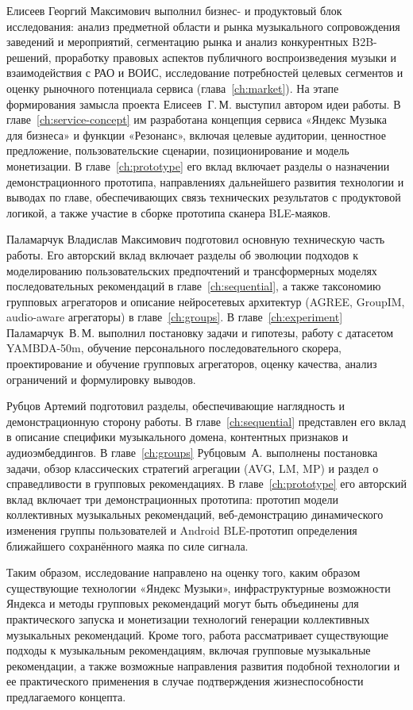 Елисеев Георгий Максимович выполнил бизнес- и продуктовый блок исследования: анализ предметной области и рынка музыкального сопровождения заведений и мероприятий, сегментацию рынка и анализ конкурентных B2B-решений, проработку правовых аспектов публичного воспроизведения музыки и взаимодействия с РАО и ВОИС, исследование потребностей целевых сегментов и оценку рыночного потенциала сервиса (глава~\ref{ch:market}). На этапе формирования замысла проекта Елисеев~Г.\,М. выступил автором идеи работы. В главе~\ref{ch:service-concept} им разработана концепция сервиса «Яндекс Музыка для бизнеса» и функции «Резонанс», включая целевые аудитории, ценностное предложение, пользовательские сценарии, позиционирование и модель монетизации. В главе~\ref{ch:prototype} его вклад включает разделы о назначении демонстрационного прототипа, направлениях дальнейшего развития технологии и выводах по главе, обеспечивающих связь технических результатов с продуктовой логикой, а также участие в сборке прототипа сканера BLE-маяков.

Паламарчук Владислав Максимович подготовил основную техническую часть работы. Его авторский вклад включает разделы об эволюции подходов к моделированию пользовательских предпочтений и трансформерных моделях последовательных рекомендаций в главе~\ref{ch:sequential}, а также таксономию групповых агрегаторов и описание нейросетевых архитектур (AGREE, GroupIM, audio-aware агрегаторы) в главе~\ref{ch:groups}. В главе~\ref{ch:experiment} Паламарчук~В.\,М. выполнил постановку задачи и гипотезы, работу с датасетом YAMBDA-50m, обучение персонального последовательного скорера, проектирование и обучение групповых агрегаторов, оценку качества, анализ ограничений и формулировку выводов.

Рубцов Артемий подготовил разделы, обеспечивающие наглядность и демонстрационную сторону работы. В главе~\ref{ch:sequential} представлен его вклад в описание специфики музыкального домена, контентных признаков и аудиоэмбеддингов. В главе~\ref{ch:groups} Рубцовым~А. выполнены постановка задачи, обзор классических стратегий агрегации (AVG, LM, MP) и раздел о справедливости в групповых рекомендациях. В главе~\ref{ch:prototype} его авторский вклад включает три демонстрационных прототипа: прототип модели коллективных музыкальных рекомендаций, веб-демонстрацию динамического изменения группы пользователей и Android BLE-прототип определения ближайшего сохранённого маяка по силе сигнала.

Таким образом, исследование направлено на оценку того, каким образом существующие технологии «Яндекс Музыки», инфраструктурные возможности Яндекса и методы групповых рекомендаций могут быть объединены для практического запуска и монетизации технологий генерации коллективных музыкальных рекомендаций. Кроме того, работа рассматривает существующие подходы к музыкальным рекомендациям, включая групповые музыкальные рекомендации, а также возможные направления развития подобной технологии и ее практического применения в случае подтверждения жизнеспособности предлагаемого концепта.
